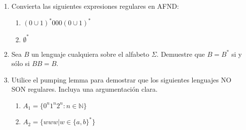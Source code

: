 \documentclass[12pt, a4paper]{article}
\begin{document}
\begin{enumerate}
\item Convierta las siguientes expresiones regulares en AFND:
\begin{enumerate}
\item $(0\cup 1)^*000(0\cup 1)^*$ 
\item $\emptyset^*$
\end{enumerate}

\item Sea $B$ un lenguaje cualquiera sobre el alfabeto $\Sigma$. Demuestre que $B=B^*$ si y sólo si $BB=B$. 


\item Utilice el pumping lemma para demostrar que los siguientes lenguajes NO SON regulares. Incluya una argumentación clara.
\begin{enumerate}
\item $A_1=\{0^n1^n2^n:n\in \mathbb{N}\}$ 
\item $A_2=\{www|w\in \{a,b\}^*\}$
\end{enumerate}



\end{enumerate}
\end{document}
